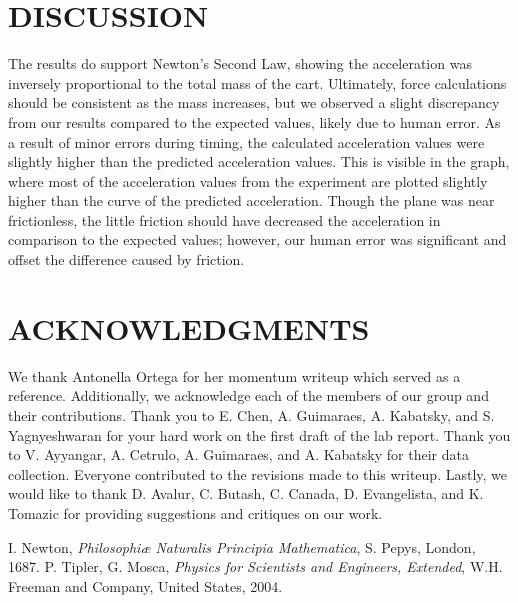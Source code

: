 \documentclass[twocolumn, 10pt]{article}
\begin{document}
\section*{DISCUSSION}
 \indent The results do support Newton's Second Law, showing the acceleration was inversely proportional to the total mass of the cart. Ultimately, force calculations should be consistent as the mass increases, but we observed a slight discrepancy from our results compared to the expected values, likely due to human error. As a result of minor errors during timing, the calculated acceleration values were slightly higher than the predicted acceleration values. This is visible in the graph, where most of the acceleration values from the experiment are plotted slightly higher than the curve of the predicted acceleration. Though the plane was near frictionless, the little friction should have decreased the acceleration in comparison to the expected values; however, our human error was significant and offset the difference caused by friction. 

\section*{ACKNOWLEDGMENTS} 
We thank Antonella Ortega for her momentum writeup which served as a reference. Additionally, we acknowledge each of the members of our group and their contributions. Thank you to E. Chen, A. Guimaraes, A. Kabatsky, and S. Yagnyeshwaran for your hard work on the first draft of the lab report. Thank you to V. Ayyangar, A. Cetrulo, A. Guimaraes, and A. Kabatsky for their data collection. Everyone contributed to the revisions made to this writeup. Lastly, we would like to thank D. Avalur, C. Butash, C. Canada, D. Evangelista, and K. Tomazic for providing suggestions and critiques on our work. 

\begin{thebibliography}{9}
 I. Newton, \textit{Philosophiæ Naturalis Principia Mathematica}, S. Pepys, London, 1687.
 P. Tipler, G. Mosca, \textit{Physics for Scientists and Engineers, Extended}, W.H. Freeman and
Company, United States, 2004.
\end{thebibliography}
\end{document}
